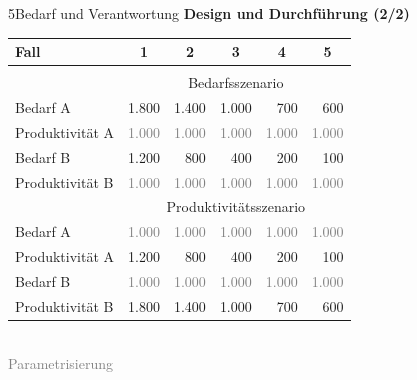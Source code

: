 \documentclass[xcolor=table,9pt,aspectratio=169]{beamer}
\begin{document}
\begin{frame}{\vspace*{10mm}5\hspace*{1em}Bedarf und Verantwortung}
\textbf{Design und Durchführung (2/2)}\\
\begin{center}
   \begin{tabular}{lrrrrr}
      \arrayrulecolor{blue2}
      \hline
      Fall                      & \multicolumn{1}{c}{1}     & \multicolumn{1}{c}{2}     & \multicolumn{1}{c}{3}     & \multicolumn{1}{c}{4}   & \multicolumn{1}{c}{5}       \\
      \hline\hline\\[-0.5em]
                                & \multicolumn{5}{c}{Bedarfsszenario}                                                                                                       \\[0.5em]
      Bedarf A                  &                  1.800    &                  1.400    &                  1.000    &                    700    &                    600    \\
      Produktivität A           & \textcolor{gray}{1.000}   & \textcolor{gray}{1.000}   & \textcolor{gray}{1.000}   & \textcolor{gray}{1.000}   & \textcolor{gray}{1.000}   \\[0.5em]
      Bedarf B                  &                  1.200    &                    800    &                    400    &                    200    &                    100    \\
      Produktivität B           & \textcolor{gray}{1.000}   & \textcolor{gray}{1.000}   & \textcolor{gray}{1.000}   & \textcolor{gray}{1.000}   & \textcolor{gray}{1.000}   \\
      \hline
                                & \multicolumn{5}{c}{Produktivitätsszenario}                                                                                                \\[0.5em]
      Bedarf A                  & \textcolor{gray}{1.000}   & \textcolor{gray}{1.000}   & \textcolor{gray}{1.000}   & \textcolor{gray}{1.000}   & \textcolor{gray}{1.000}   \\
      Produktivität A           &                  1.200    &                    800    &                    400    &                    200    &                    100    \\[0.5em]
      Bedarf B                  & \textcolor{gray}{1.000}   & \textcolor{gray}{1.000}   & \textcolor{gray}{1.000}   & \textcolor{gray}{1.000}   & \textcolor{gray}{1.000}   \\
      Produktivität B           &                  1.800    &                  1.400    &                  1.000    &                    700    &                    600    \\
      \hline
   \end{tabular}\\
   \smallskip
   \footnotesize{\textcolor{gray}{Parametrisierung}}
\end{center}
\end{frame}
\end{document}
